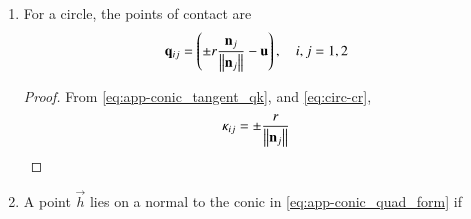 \begin{enumerate}[label=\thesubsection.\arabic*.,ref=\thesubsection.\theenumi]
  \begin{proof}
The normal vectors of the lines in \eqref{eq:quad_form_pair} are 
  \begin{align} 
  \label{eq:quad_form_pair_normvecs}
  \begin{split}
  \vec{n}_1 &= \vec{P}\myvec{\sqrt{\abs{\lambda_1}} \\[2mm]  \sqrt{\abs{\lambda_2}}}
  \\
  \vec{n}_2 &= \vec{P}\myvec{\sqrt{\abs{\lambda_1}} \\[2mm] - \sqrt{\abs{\lambda_2}}}
  \end{split}
  \end{align} 
  The angle between the asymptotes is given by 
\begin{align} 
\label{eq:app-quad_form_pair_ang_exp}
\cos\theta=\frac{\vec{n_1}^{\top}\vec{n_2}}{\norm{\vec{n_1}}\norm{\vec{n_2}}}
\end{align} 
The orthogonal matrix $\vec{P}$ preserves the norm, i.e.
\begin{align} 
	\norm{\vec{n_1}} &= \norm{\vec{P}\myvec{\sqrt{\abs{\lambda_1}} \\[2mm]  \sqrt{\abs{\lambda_2}}}}
	=\norm{\myvec{\sqrt{\abs{\lambda_1}} \\[2mm]  \sqrt{\abs{\lambda_2}}}}
	\\
	&=\sqrt{\abs{\lambda_1}+\abs{\lambda_2}} = \norm{\vec{n_2}}
\end{align} 
It is easy to verify that 
\begin{align} 
\vec{n_1}^{\top}\vec{n_2} = \abs{\lambda_1}-\abs{\lambda_2}
\end{align} 
%
Thus, the angle between the asymptotes is obtained from \eqref{eq:app-quad_form_pair_ang_exp} as \eqref{eq:app-quad_form_pair_ang}.
  \end{proof}
\item For a circle, the points of contact are
	\begin{align}
	\mathbf{q}_{ij} &= \left(\pm r \frac{\mathbf{n}_j}{\left\lVert\mathbf{n}_j\right\rVert}-\mathbf{u}\right), \quad i,j = 1,2
\end{align}
\begin{proof}
	From 
\eqref{eq:app-conic_tangent_qk},
and 
	\eqref{eq:circ-cr},
\begin{align}
\kappa_{ij} &= \pm 
\frac{r
}
{
	\left\lVert\mathbf{n}_j\right\rVert
}
\end{align}
\end{proof}
\item A point $\vec{h}$ lies on a normal to the conic in \eqref{eq:app-conic_quad_form} 
	if
\begin{multline}

\end{multline}
\end{enumerate}
